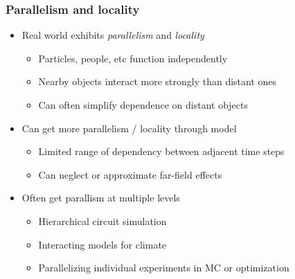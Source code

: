 \documentclass{beamer}
\begin{document}
\begin{frame}
  \titlepage
\end{frame}


\begin{frame}
  \frametitle{Parallelism and locality}

  \begin{itemize}
  \item Real world exhibits {\em parallelism} and {\em locality}
    \begin{itemize}
    \item Particles, people, etc function independently
    \item Nearby objects interact more strongly than distant ones
    \item Can often simplify dependence on distant objects
    \end{itemize}
  \item Can get more parallelism / locality through model
    \begin{itemize}
    \item Limited range of dependency between adjacent time steps
    \item Can neglect or approximate far-field effects
    \end{itemize}
  \item Often get parallism at multiple levels
    \begin{itemize}
    \item Hierarchical circuit simulation
    \item Interacting models for climate
    \item Parallelizing individual experiments in MC or optimization
    \end{itemize}
  \end{itemize}
\end{frame}
\end{document}
